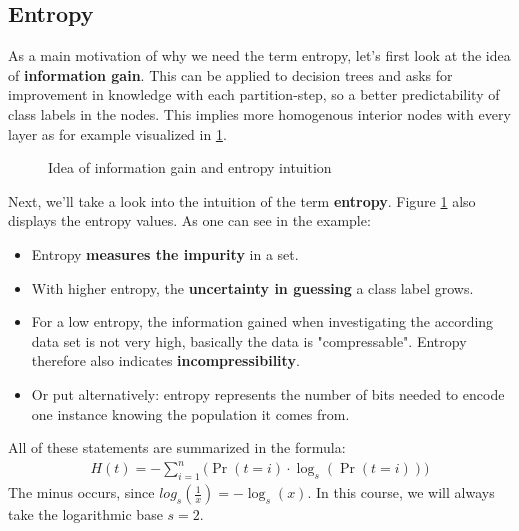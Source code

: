 \subsection{Entropy}

As a main motivation of why we need the term entropy, let's first look at the idea of \textbf{information gain}. This can be applied to decision trees and asks for improvement in knowledge with each partition-step, so a better predictability of class labels in the nodes. This implies more homogenous interior nodes with every layer as for example visualized in \ref{fig:3_information_gain}.

\begin{figure}[h]
  \centering
  \caption{Idea of information gain and entropy intuition}
  \label{fig:3_information_gain}
\end{figure}

Next, we'll take a look into the intuition of the term \textbf{entropy}. Figure \ref{fig:3_information_gain} also displays the entropy values. As one can see in the example:
\begin{itemize}
  \item Entropy \textbf{measures the impurity} in a set.
  \item With higher entropy, the \textbf{uncertainty in guessing} a class label grows.
  \item For a low entropy, the information gained when investigating the according data set is not very high, basically the data is "compressable". Entropy therefore also indicates \textbf{incompressibility}.
  \item Or put alternatively: entropy represents the number of bits needed to encode one instance knowing the population it comes from.
\end{itemize}

All of these statements are summarized in the formula:
\begin{align*}
  H(t) = - \sum_{i=1}^{n} \big( \Pr(t=i) \cdot \log_s (\Pr(t=i)) \big)
\end{align*}
The minus occurs, since $log_s(\frac{1}{x})=-\log_s(x)$. In this course, we will always take the logarithmic base $s=2$.

